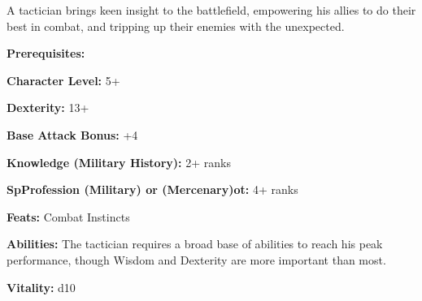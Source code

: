 \begin{multicols}{2}

A tactician brings keen insight to the battlefield, empowering his allies to do their best in combat, and tripping up their enemies with the unexpected.

\columnbreak

\textbf{Prerequisites:} 
\begin{description*}
\item[\hspace{1.5cm}\textbf{Character Level:}] 5+
\item[\hspace{1.5cm}\textbf{Dexterity:}] 13+
\item[\hspace{1.5cm}\textbf{Base Attack Bonus:}] +4
\item[\hspace{1.5cm}\textbf{Knowledge (Military History):}] 2+ ranks
\item[\hspace{1.5cm}\textbf{SpProfession (Military) or (Mercenary)ot:}] 4+ ranks
\item[\hspace{1.5cm}\textbf{Feats:}] Combat Instincts
\end{description*}

\textbf{Abilities:} The tactician requires a broad base of abilities to reach his peak performance, though Wisdom and Dexterity are more important than most.

\textbf{Vitality:} d10

\end{multicols}

\setlength{\intextsep}{-4cm}

